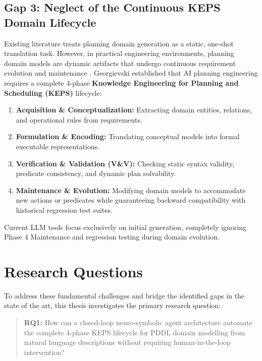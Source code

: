 \documentclass[11pt,a4paper]{report}
\begin{document}
\subsection{Gap 3: Neglect of the Continuous KEPS Domain Lifecycle}
Existing literature treats planning domain generation as a static, one-shot translation task. However, in practical engineering environments, planning domain models are dynamic artifacts that undergo continuous requirement evolution and maintenance \cite{georgievski2023}. Georgievski \cite{georgievski2023, georgievski2024} established that AI planning engineering requires a complete 4-phase \textbf{Knowledge Engineering for Planning and Scheduling (KEPS)} lifecycle:
\begin{enumerate}[label=Phase \arabic*:]
    \item \textbf{Acquisition \& Conceptualization:} Extracting domain entities, relations, and operational rules from requirements.
    \item \textbf{Formulation \& Encoding:} Translating conceptual models into formal executable representations.
    \item \textbf{Verification \& Validation (V\&V):} Checking static syntax validity, predicate consistency, and dynamic plan solvability.
    \item \textbf{Maintenance \& Evolution:} Modifying domain models to accommodate new actions or predicates while guaranteeing backward compatibility with historical regression test suites.
\end{enumerate}
Current LLM tools focus exclusively on initial generation, completely ignoring Phase 4 Maintenance and regression testing during domain evolution.

\section{Research Questions}
To address these fundamental challenges and bridge the identified gaps in the state of the art, this thesis investigates the primary research question:
\begin{quote}
    \textbf{RQ1:} How can a closed-loop neuro-symbolic agent architecture automate the complete 4-phase KEPS lifecycle for PDDL domain modelling from natural language descriptions without requiring human-in-the-loop intervention?
\end{quote}
\end{document}
